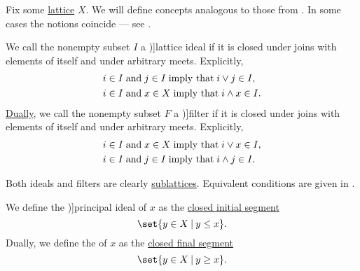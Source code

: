 \begin{definition}\label{def:lattice_ideal}
  Fix some \hyperref[def:lattice]{lattice} \( X \). We will define concepts analogous to those from . In some cases the notions coincide --- see .

  \item
  \begin{TwoColumns}
    We call the nonempty subset \( I \) a \term[ru=решёточный идеал (\cite[def. 4.5]{Гуров2013})]{lattice ideal} if it is closed under joins with elements of itself and under arbitrary meets. Explicitly,
    \begin{align}
      &i \in I \T{and} j \in I \T{imply that} i \vee j \in I, \label{eq:def:lattice_ideal/lattice_join} \\
      &i \in I \T{and} x \in X \T{imply that} i \wedge x \in I. \label{eq:def:lattice_ideal/lattice_meet}
    \end{align}
  \BeginSecondColumn
    \hyperref[thm:lattice_duality]{Dually}, we call the nonempty subset \( F \) a \term[ru=решёточный фильтр (\cite[def. 4.5]{Гуров2013})]{filter} if it is closed under joins with elements of itself and under arbitrary meets. Explicitly,
    \begin{align}
      &i \in I \T{and} x \in X \T{imply that} i \vee x \in I, \label{eq:def:lattice_ideal/filter_join} \\
      &i \in I \T{and} j \in I \T{imply that} i \wedge j \in I. \label{eq:def:lattice_ideal/filter_meet}
    \end{align}
  \end{TwoColumns}

  Both ideals and filters are clearly \hyperref[def:lattice/submodel]{sublattices}. Equivalent conditions are given in .

  \begin{thmenum}
    \begin{TwoColumns}
      We define the \term[ru=главный (идеал) (\cite[140]{Гуров2013})]{principal ideal} of \( x \) as the \hyperref[def:order_interval/unbounded]{closed initial segment}
      \begin{equation*}
        \set{ y \in X \given y \leq x }.
      \end{equation*}
    \BeginSecondColumn
      Dually, we define the  of \( x \) as the \hyperref[def:order_interval/unbounded]{closed final segment}
      \begin{equation*}
        \set{ y \in X \given y \geq x }.
      \end{equation*}
    \end{TwoColumns}


\end{thmenum}
\end{definition}
